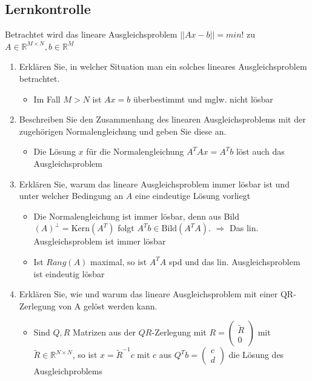 \documentclass[]{article}
\begin{document}
\subsection{Lernkontrolle}
	Betrachtet wird das lineare Ausgleichsproblem $||Ax-b|| = min!$ zu $A \in \mathbb{R}^{M \times N}, b \in \mathbb{R}^M$
	\begin{enumerate}
		\item Erklären Sie, in welcher Situation man ein solches lineares Ausgleichsproblem betrachtet.
			\begin{itemize}
				\item Im Fall $M > N$ ist $Ax=b$ überbestimmt und mglw. nicht lösbar
			\end{itemize}
		\item Beschreiben Sie den Zusammenhang des linearen Ausgleichsproblems mit der zugehörigen Normalengleichung und geben Sie diese an.
			\begin{itemize}
				\item Die Lösung $x$ für die Normalengleichung $A^TAx = A^Tb$ löst auch das Ausgleichsproblem
			\end{itemize}
		\item Erklären Sie, warum das lineare Ausgleichsproblem immer lösbar ist und unter welcher Bedingung an $A$ eine eindeutige Lösung vorliegt
			\begin{itemize}
				\item Die Normalengleichung ist immer lösbar, denn aus Bild$(A)^{\perp} = \text{Kern}(A^T)$ folgt $A^Tb \in \text{Bild}(A^TA)$. $\Rightarrow$ Das lin. Ausgleichsproblem ist immer lösbar
				\item Ist $Rang(A)$ maximal, so ist $A^TA$ spd und das lin. Ausgleichsproblem ist eindeutig lösbar
			\end{itemize}
		\item Erklären Sie, wie und warum das lineare Ausgleichsproblem mit einer QR-Zerlegung von A gelöst werden kann.
			\begin{itemize}
				\item Sind $Q, R$ Matrizen aus der $QR$-Zerlegung mit $R = \left (\begin{array}{r} \tilde{R} \\ 0 \end{array} \right)$ mit $\tilde{R} \in \mathbb{R}^{N \times N}$, so ist $x = \tilde{R}^{-1} c$ mit $c$ aus $Q^Tb = \left (\begin{array}{r} c \\ d \end{array} \right)$ die Lösung des Ausgleichproblems

\end{itemize}
\end{enumerate}
\end{document}
